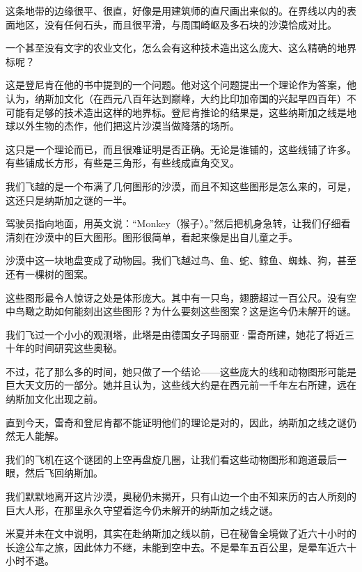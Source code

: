 \par 这条地带的边缘很平、很直，好像是用建筑师的直尺画出来似的。在界线以内的表面地区，没有任何石头，而且很平滑，与周围崎岖及多石块的沙漠恰成对比。
\par 一个甚至没有文字的农业文化，怎么会有这种技术造出这么庞大、这么精确的地界标呢？
\par 这是登尼肯在他的书中提到的一个问题。他对这个问题提出一个理论作为答案，他认为，纳斯加文化（在西元八百年达到巅峰，大约比印加帝国的兴起早四百年）不可能有足够的技术造出这样的地界标。登尼肯推论的结果是，这些纳斯加之线是地球以外生物的杰作，他们把这片沙漠当做降落的场所。
\par 这只是一个理论而已，而且很难证明是否正确。无论是谁铺的，这些线铺了许多。有些铺成长方形，有些是三角形，有些线成直角交叉。
\par 我们飞越的是一个布满了几何图形的沙漠，而且不知这些图形是怎么来的，可是，这还只是纳斯加之谜的一半。
\par 驾驶员指向地面，用英文说：“Monkey（猴子）。”然后把机身急转，让我们仔细看清刻在沙漠中的巨大图形。图形很简单，看起来像是出自儿童之手。
\par 沙漠中这一块地盘变成了动物园。我们飞越过鸟、鱼、蛇、鲸鱼、蜘蛛、狗，甚至还有一棵树的图案。
\par 这些图形最令人惊讶之处是体形庞大。其中有一只鸟，翅膀超过一百公尺。没有空中鸟瞰之助如何能刻出这些图形？为什么要刻这些图案？这是迄今仍未解开的谜。
\par 我们飞过一个小小的观测塔，此塔是由德国女子玛丽亚·雷奇所建，她花了将近三十年的时间研究这些奥秘。
\par 不过，花了那么多的时间，她只做了一个结论——这些庞大的线和动物图形可能是巨大天文历的一部分。她并且认为，这些线大约是在西元前一千年左右所建，远在纳斯加文化出现之前。
\par 直到今天，雷奇和登尼肯都不能证明他们的理论是对的，因此，纳斯加之线之谜仍然无人能解。
\par 我们的飞机在这个谜团的上空再盘旋几圈，让我们看这些动物图形和跑道最后一眼，然后飞回纳斯加。
\par 我们默默地离开这片沙漠，奥秘仍未揭开，只有山边一个由不知来历的古人所刻的巨大人形，在那里永久守望着迄今仍未解开的纳斯加之线之谜。
\\
\par {}
\par 米夏并未在文中说明，其实在赴纳斯加之线以前，已在秘鲁全境做了近六十小时的长途公车之旅，因此体力不继，未能到空中去。不是晕车五百公里，是晕车近六十小时不退。



